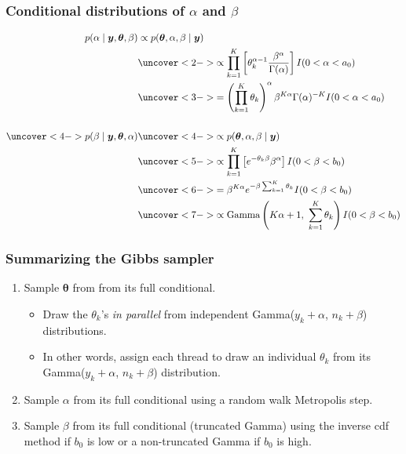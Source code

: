\documentclass[handout]{beamer}
\providecommand{\vc}[1]{\boldsymbol{#1}}
\numberwithin{equation}{section}
\begin{document}
\begin{frame} 
\frametitle{Conditional distributions of $\alpha$ and $\beta$} \small
\begin{align*}
p(\alpha \mid \vc{y}, \vc{\theta}, \beta) &\propto p(\vc{\theta}, \alpha, \beta \mid \vc{y}) \\
&\uncover<2->{\propto \prod_{k = 1}^K \left [ \theta_k^{\alpha - 1} \frac{\beta^\alpha}{\Gamma(\alpha)} \right ] I(0 < \alpha < a_0)} \\
&\uncover<3->{=\left (\prod_{k = 1}^K \theta_k \right )^\alpha \beta^{K \alpha} \Gamma(\alpha)^{-K} I(0 < \alpha < a_0)} \\ \\
\uncover<4->{p(\beta \mid \vc{y}, \vc{\theta}, \alpha)} &\uncover<4->{\propto p(\vc{\theta}, \alpha, \beta \mid \vc{y})} \\
&\uncover<5->{\propto \prod_{k = 1}^K \left [ e^{-\theta_k \beta} \beta^\alpha \right ] I(0 < \beta < b_0)} \\
&\uncover<6->{=\beta^{K \alpha} e^{- \beta \sum_{k = 1}^K \theta_k} I(0 < \beta < b_0)} \\
&\uncover<7->{\propto \text{Gamma}\left (K \alpha + 1, \ \sum_{k = 1}^K \theta_k \right) I(0 < \beta < b_0)}
\end{align*}
\end{frame}


\begin{frame}
\frametitle{Summarizing the Gibbs sampler}
\begin{enumerate}
\item Sample $\vc{\theta}$ from from its full conditional.
\begin{itemize}
\pause \item Draw the $\theta_k$'s \emph{in parallel} from independent Gamma($y_k + \alpha$, $n_k + \beta$) distributions.
\pause \item In other words, assign each thread to draw an individual $\theta_k$ from its Gamma($y_k + \alpha$, $n_k + \beta$) distribution.
\end{itemize}
\pause \item Sample $\alpha$ from its full conditional using a random walk Metropolis step.
\pause \item Sample $\beta$ from its full conditional (truncated Gamma) using the inverse cdf method if $b_0$ is low or a non-truncated Gamma if $b_0$ is high.
\end{enumerate}

\end{frame}
\end{document}
